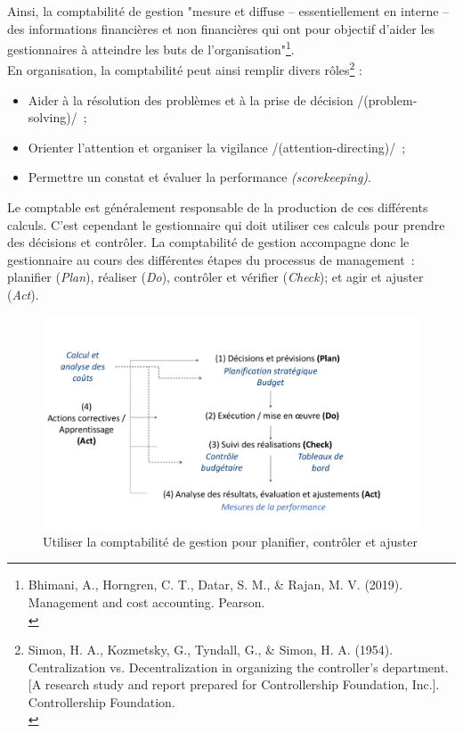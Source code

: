 \documentclass{tufte-handout}
\begin{document}
Ainsi, la comptabilité de gestion "mesure et diffuse – essentiellement en interne – des informations financières et non financières qui ont pour objectif d'aider les gestionnaires à atteindre les buts de l’organisation"\footnote{Bhimani, A., Horngren, C. T., Datar, S. M., \& Rajan, M. V. (2019). Management and cost accounting. Pearson.\\}.\\

En organisation, la comptabilité peut ainsi remplir divers rôles\footnote{Simon, H. A., Kozmetsky, G., Tyndall, G., \& Simon, H. A. (1954). Centralization vs. Decentralization in organizing the controller’s department. [A research study and report prepared for Controllership Foundation, Inc.]. Controllership Foundation.\\} :\\
\begin{itemize}
\item Aider à la résolution des problèmes et à la prise de décision /(problem-solving)/ ;\\
\item Orienter l’attention et organiser la vigilance /(attention-directing)/ ;\\
\item Permettre un constat et évaluer la performance \emph{(scorekeeping)}.\\
\end{itemize}

Le comptable est généralement responsable de la production de ces différents calculs. C'est cependant le gestionnaire qui doit utiliser ces calculs pour prendre des décisions et contrôler. La comptabilité de gestion accompagne donc le gestionnaire au cours des différentes étapes du processus de management : planifier (\emph{Plan}), réaliser (\emph{Do}), contrôler et vérifier (\emph{Check}); et agir et ajuster (\emph{Act}).\\

\begin{figure}[htbp]
\centering
\includegraphics[width=.9\linewidth]{./img/pdca.pdf}
\caption{\label{fig:orge4f0aa3}Utiliser la comptabilité de gestion pour planifier, contrôler et ajuster}
\end{figure}
\end{document}
